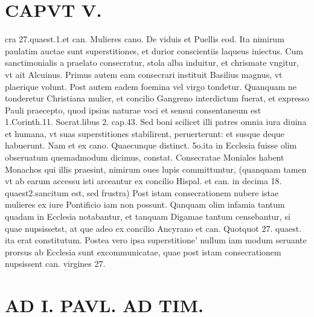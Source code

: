 \documentclass{article}
\begin{document}
\begin{pages}
\section*{CAPVT V. }
\marginpar{[ p.295 ]}\pstart cra 27.quaest.1.et can. Mulieres cano. De viduis et Puellis eod. Ita nimirum paulatim auctae sunt superstitiones, et durior conscientiis laqueus iniectus. Cum sanctimonialis a praelato consecratur, stola alba induitur, et chrismate vngitur, vt ait Alcuinus. Primus autem eam consecrari instituit Basilius magnus, vt plaerique volunt. Post autem eadem foemina vel virgo tondetur. Quanquam ne tonderetur Christiana mulier, et concilio Gangreno interdictum fuerat, et expresso Pauli praecepto, quod ipsius naturae voci et sensui consentaneum est 1.Corinth.11. Socrat.libus 2. cap.43. Sed boni scilicet illi patres omnia iura diuina et humana, vt suas superstitiones stabilirent, peruerterunt: et susque deque habuerunt. Nam et ex cano. Quaecunque distinct. 5o.ita in Ecclesia fuisse olim obseruatum quemadmodum dicimus, constat. Consecratae Moniales habent Monachos qui illis praesint, nimirum oues lupis committuntur, (quanquam tamen vt ab earum accessu isti arceantur ex concilio Hispal. et can. in decima 18. quaest2.sancitum est, sed frustra) Post istam consecrationem nubere istae mulieres ex iure Pontificio iam non possunt. Qanquam olim infamia tantum quadam in Ecclesia notabantur, et tanquam Digamae tantum censebantur, si quae nupsissetst, at que adeo ex concilio Ancyrano et can. Quotquot 27. quaest. ita erat constitutum. Postea vero ipsa superstitione' nullum iam modum seruante prorsus ab Ecclesia sunt excommunicatae, quae post istam consecrationem nupsissent can. virgines 27.  \pend
\section*{AD I. PAVL. AD TIM. }
\marginpar{[ p.296 ]}\pstart {}
{}

\end{pages}
\end{document}
